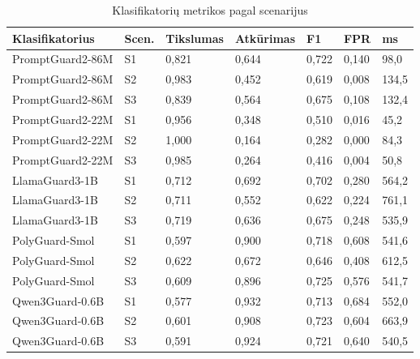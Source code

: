 \begin{table}[H]
  \caption{Klasifikatorių metrikos pagal scenarijus}\label{lent:metrikos}
  \lentelesTekstas
  \small
  \begin{tabularx}{\textwidth}{|>{\raggedright\arraybackslash}X|C{1.2cm}|C{2.1cm}|C{2.1cm}|C{1.4cm}|C{1.4cm}|C{1.3cm}|}
    \hline
    \textbf{Klasifikatorius} & \textbf{Scen.} & \textbf{Tikslumas} & \textbf{Atkūrimas} & \textbf{F1} & \textbf{FPR} & \textbf{ms} \\
    \hline
    PromptGuard2-86M & S1 & 0,821 & 0,644 & 0,722 & 0,140 & 98,0 \\
    \hline
    PromptGuard2-86M & S2 & 0,983 & 0,452 & 0,619 & 0,008 & 134,5 \\
    \hline
    PromptGuard2-86M & S3 & 0,839 & 0,564 & 0,675 & 0,108 & 132,4 \\
    \hline
    PromptGuard2-22M & S1 & 0,956 & 0,348 & 0,510 & 0,016 & 45,2 \\
    \hline
    PromptGuard2-22M & S2 & 1,000 & 0,164 & 0,282 & 0,000 & 84,3 \\
    \hline
    PromptGuard2-22M & S3 & 0,985 & 0,264 & 0,416 & 0,004 & 50,8 \\
    \hline
    LlamaGuard3-1B & S1 & 0,712 & 0,692 & 0,702 & 0,280 & 564,2 \\
    \hline
    LlamaGuard3-1B & S2 & 0,711 & 0,552 & 0,622 & 0,224 & 761,1 \\
    \hline
    LlamaGuard3-1B & S3 & 0,719 & 0,636 & 0,675 & 0,248 & 535,9 \\
    \hline
    PolyGuard-Smol & S1 & 0,597 & 0,900 & 0,718 & 0,608 & 541,6 \\
    \hline
    PolyGuard-Smol & S2 & 0,622 & 0,672 & 0,646 & 0,408 & 612,5 \\
    \hline
    PolyGuard-Smol & S3 & 0,609 & 0,896 & 0,725 & 0,576 & 541,7 \\
    \hline
    Qwen3Guard-0.6B & S1 & 0,577 & 0,932 & 0,713 & 0,684 & 552,0 \\
    \hline
    Qwen3Guard-0.6B & S2 & 0,601 & 0,908 & 0,723 & 0,604 & 663,9 \\
    \hline
    Qwen3Guard-0.6B & S3 & 0,591 & 0,924 & 0,721 & 0,640 & 540,5 \\
    \hline
  \end{tabularx}
\end{table}


